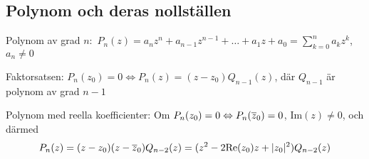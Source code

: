 \documentclass{article}
\newcommand{\Le}{\Leftrightarrow}
\begin{document}

\subsection*{Polynom och deras nollställen} %
Polynom av grad $n$:\, $P_n(z)
   =a_nz^n+a_{n-1}z^{n-1}+\dots+a_1z+a_0
   =\sum_{k=0}^n a_kz^k$, 
   $a_n\neq 0$

Faktorsatsen: $P_n(z_0)=0 \iff P_n(z) = (z-z_0)Q_{n-1}(z)$, där $Q_{n-1}$ är
polynom av grad $n-1$

\bigskip

   Polynom med reella koefficienter: 
   Om $P_n(z_0)=0\Leftrightarrow P_n(\overline z_0)=0$, $\text{Im}(z)\neq0$, och därmed
   $$
   P_n(z)
    =(z-z_0)(z-\overline z_0)Q_{n-2}(z)
    =(z^2-2\text{Re}(z_0)z +|z_0|^2)Q_{n-2}(z)
   $$
\end{document}
